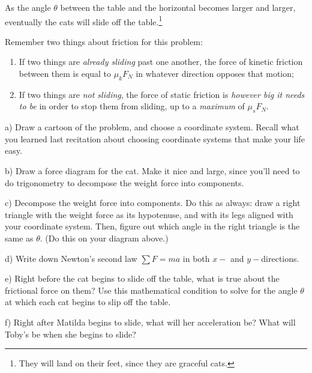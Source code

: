 \documentclass[12pt]{article}
\begin{document}
		As the angle $\theta$ between the table and the horizontal becomes larger and larger, eventually the cats will slide off the 
		table.\footnote{They will land on their feet, since they are graceful cats.}
		
		Remember two things about friction for this problem:
		
		\begin{enumerate}
			\item If two things are {\it already sliding} past one another, the force of kinetic friction between them is equal to $\mu_k F_N$ in whatever direction opposes that motion;
			\item If two things are {\it not sliding}, the force of static friction is {\it however big it needs to be} in order to stop
			them from sliding, up to a {\it maximum} of $\mu_s F_N$.
		\end{enumerate}
		
		a) Draw a cartoon of the problem, and choose a coordinate system. Recall what you learned last recitation about choosing
		coordinate systems that make your life easy.
		\vfill
		

		\newpage
		
		b) Draw a force diagram for the cat. Make it nice and large, since you'll need to do trigonometry to decompose the 
		weight force into components.
		
		\vspace{3in}
		
		
		c) Decompose the weight force into components. Do this as always: draw a right triangle with the weight force as its 
		hypotenuse, and with its legs aligned with your coordinate system. Then, figure out which angle in the right triangle
		is the same as $\theta$. (Do this on your diagram above.)
		
		d) Write down Newton's second law $\sum F = ma$ in both $x-$ and $y-$directions. 
		
		\vspace{2in}
		\newpage
		
		e) Right before the cat begins to slide off the table, what is true about the frictional force on them? Use this 
		mathematical condition to solve for the angle $\theta$ at which each cat begins to slip off the table.
		
		\vspace{3in}
		
		f) Right after Matilda begins to slide, what will her acceleration be? What will Toby's be when she begins to slide? 
		
		
	
\end{document}
